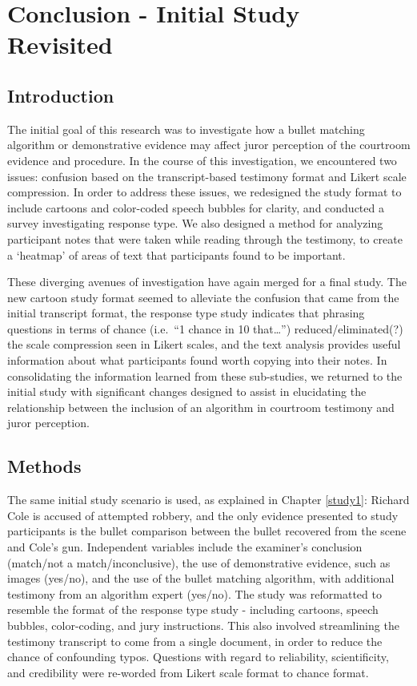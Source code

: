 \documentclass[print]{nuthesis}
\begin{document}
\hypertarget{finalstudy}{%
\chapter{Conclusion - Initial Study Revisited}\label{finalstudy}}

\hypertarget{introduction-2}{%
\section{Introduction}\label{introduction-2}}

The initial goal of this research was to investigate how a bullet matching algorithm or demonstrative evidence may affect juror perception of the courtroom evidence and procedure.
In the course of this investigation, we encountered two issues: confusion based on the transcript-based testimony format and Likert scale compression.
In order to address these issues, we redesigned the study format to include cartoons and color-coded speech bubbles for clarity, and conducted a survey investigating response type.
We also designed a method for analyzing participant notes that were taken while reading through the testimony, to create a `heatmap' of areas of text that participants found to be important.

These diverging avenues of investigation have again merged for a final study.
The new cartoon study format seemed to alleviate the confusion that came from the initial transcript format, the response type study indicates that phrasing questions in terms of chance (i.e.~``1 chance in 10 that\ldots{}'') reduced/eliminated(?) the scale compression seen in Likert scales, and the text analysis provides useful information about what participants found worth copying into their notes.
In consolidating the information learned from these sub-studies, we returned to the initial study with significant changes designed to assist in elucidating the relationship between the inclusion of an algorithm in courtroom testimony and juror perception.

\hypertarget{methods-3}{%
\section{Methods}\label{methods-3}}

The same initial study scenario is used, as explained in Chapter \ref{study1}: Richard Cole is accused of attempted robbery, and the only evidence presented to study participants is the bullet comparison between the bullet recovered from the scene and Cole's gun.
Independent variables include the examiner's conclusion (match/not a match/inconclusive), the use of demonstrative evidence, such as images (yes/no), and the use of the bullet matching algorithm, with additional testimony from an algorithm expert (yes/no).
The study was reformatted to resemble the format of the response type study - including cartoons, speech bubbles, color-coding, and jury instructions.
This also involved streamlining the testimony transcript to come from a single document, in order to reduce the chance of confounding typos.
Questions with regard to reliability, scientificity, and credibility were re-worded from Likert scale format to chance format.
\end{document}
